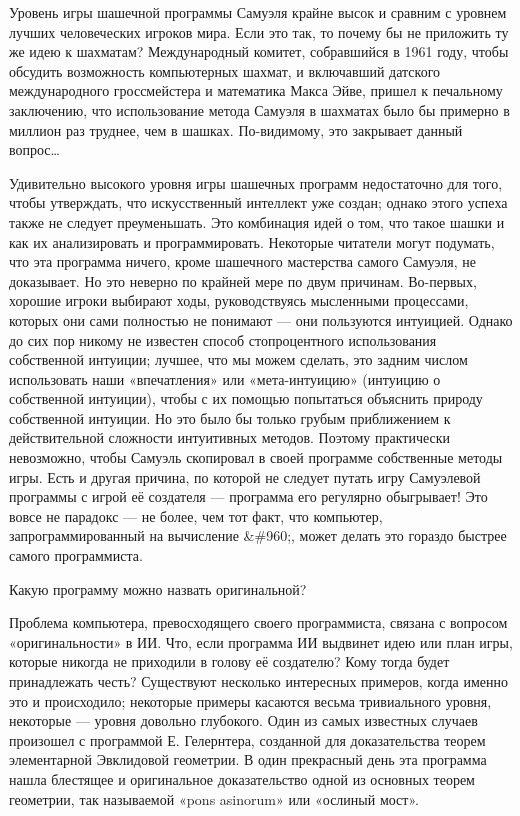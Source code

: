 \documentclass[../main.tex]{subfiles}
\begin{document}
Уровень игры шашечной программы Самуэля крайне высок и сравним с уровнем лучших человеческих игроков мира. Если это так, то почему бы не приложить ту же идею к шахматам? Международный комитет, собравшийся в 1961 году, чтобы обсудить возможность компьютерных шахмат, и включавший датского международного гроссмейстера и математика Макса Эйве, пришел к печальному заключению, что использование метода Самуэля в шахматах было бы примерно в миллион раз труднее, чем в шашках. По-видимому, это закрывает данный вопрос\ldots{}

Удивительно высокого уровня игры шашечных программ недостаточно для того, чтобы утверждать, что искусственный интеллект уже создан; однако этого успеха также не следует преуменьшать. Это комбинация идей о том, что такое шашки и как их анализировать и программировать. Некоторые читатели могут подумать, что эта программа ничего, кроме шашечного мастерства самого Самуэля, не доказывает. Но это неверно по крайней мере по двум причинам. Во-первых, хорошие игроки выбирают ходы, руководствуясь мысленными процессами, которых они сами полностью не понимают --- они пользуются интуицией. Однако до сих пор никому не известен способ стопроцентного использования собственной интуиции; лучшее, что мы можем сделать, это задним числом использовать наши «впечатления» или «мета-интуицию» (интуицию о собственной интуиции), чтобы с их помощью попытаться объяснить природу собственной интуиции. Но это было бы только грубым приближением к действительной сложности интуитивных методов. Поэтому практически невозможно, чтобы Самуэль скопировал в своей программе собственные методы игры. Есть и другая причина, по которой не следует путать игру Самуэлевой программы с игрой её создателя --- программа его регулярно обыгрывает! Это вовсе не парадокс --- не более, чем тот факт, что компьютер, запрограммированный на вычисление \&\#960;, может делать это гораздо быстрее самого программиста.

Какую программу можно назвать оригинальной?

Проблема компьютера, превосходящего своего программиста, связана с вопросом «оригинальности» в ИИ\@. Что, если программа ИИ выдвинет идею или план игры, которые никогда не приходили в голову её создателю? Кому тогда будет принадлежать честь? Существуют несколько интересных примеров, когда именно это и происходило; некоторые примеры касаются весьма тривиального уровня, некоторые --- уровня довольно глубокого. Один из самых известных случаев произошел с программой Е. Гелернтера, созданной для доказательства теорем элементарной Эвклидовой геометрии. В один прекрасный день эта программа нашла блестящее и оригинальное доказательство одной из основных теорем геометрии, так называемой «pons asinorum» или «ослиный мост».
\end{document}
